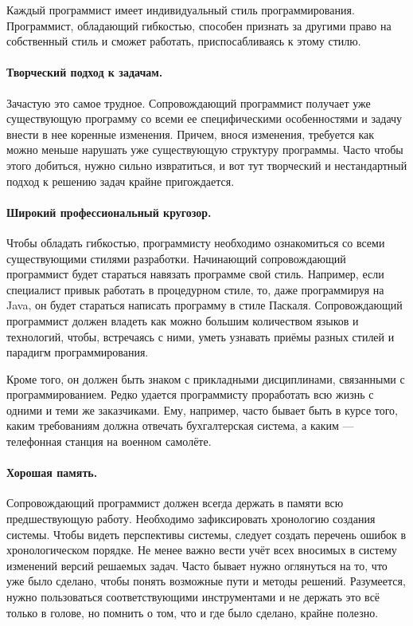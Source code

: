 \documentclass{../../text-style}
\begin{document}
Каждый программист имеет индивидуальный стиль программирования. Программист, обладающий гибкостью, способен признать за другими право на собственный стиль и сможет работать, приспосабливаясь к этому стилю.

\paragraph{Творческий подход к задачам.} Зачастую это самое трудное. Сопровождающий программист получает уже существующую программу со всеми ее специфическими особенностями и задачу внести в нее коренные изменения. Причем, внося изменения, требуется как можно меньше нарушать уже существующую структуру программы. Часто чтобы этого добиться, нужно сильно извратиться, и вот тут творческий и нестандартный подход к решению задач крайне пригождается.

\paragraph{Широкий профессиональный кругозор.} Чтобы обладать гибкостью, программисту необходимо ознакомиться со всеми существующими стилями разработки. Начинающий сопровождающий программист будет стараться навязать программе свой стиль. Например, если специалист привык работать в процедурном стиле, то, даже программируя на Java, он будет стараться написать программу в стиле Паскаля. Сопровождающий программист должен владеть как можно большим количеством языков и технологий, чтобы, встречаясь с ними, уметь узнавать приёмы разных стилей и парадигм программирования.

Кроме того, он должен быть знаком с прикладными дисциплинами, связанными с программированием. Редко удается программисту проработать всю жизнь с одними и теми же заказчиками. Ему, например, часто бывает быть в курсе того, каким требованиям должна отвечать бухгалтерская система, а каким --- телефонная станция на военном самолёте.

\paragraph{Хорошая память.} Сопровождающий программист должен всегда держать в памяти всю предшествующую работу. Необходимо зафиксировать хронологию создания системы. Чтобы видеть перспективы системы, следует создать перечень ошибок в хронологическом порядке. Не менее важно вести учёт всех вносимых в систему изменений версий решаемых задач. Часто бывает нужно оглянуться на то, что уже было сделано, чтобы понять возможные пути и методы решений. Разумеется, нужно пользоваться соответствующими инструментами и не держать это всё только в голове, но помнить о том, что и где было сделано, крайне полезно.
\end{document}

